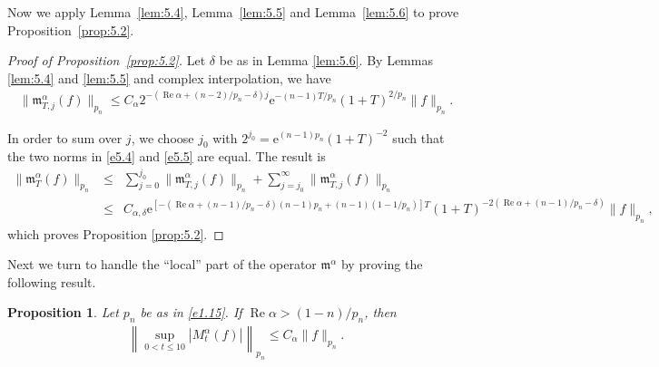 \documentclass[11pt]{amsproc}
\newcommand{\e}{\mathrm{e}}
\newcommand{\fm}{\mathfrak{m}}
\newcommand{\0}{\mathbf{0}}
\renewcommand{\Re}{\mathop{\mathrm{Re}}}
\numberwithin{equation}{section}
\numberwithin{figure}{section}
\newtheorem{prop}[thm]{Proposition}
\theoremstyle{definition}
\theoremstyle{remark}
\numberwithin{thm}{section}
\begin{document}
Now we apply Lemma~\ref{lem:5.4}, Lemma~\ref{lem:5.5} and Lemma~\ref{lem:5.6}  to prove    Proposition~\ref{prop:5.2}.





\begin{proof}[Proof of Proposition~\ref{prop:5.2}]
Let $\delta$ be as in Lemma \ref{lem:5.6}. By Lemmas \ref{lem:5.4} and \ref{lem:5.5} and complex interpolation, we have
\begin{eqnarray}
\|\fm^\alpha_{T,j}(f)\|_{p_n}\leq C_\alpha2^{-(\Re \alpha+(n-2)/p_n-\delta)j}\e^{-(n-1)T/p_n}(1+T)^{2/p_n}\|f\|_{p_n}\label{e5.5}.
\end{eqnarray}

In order to sum over $j$, we choose  $j_0$ with $2^{j_0}=\e^{(n-1)p_n}(1+T)^{-2}$   such that the two norms in \eqref{e5.4} and \eqref{e5.5} are  equal. The result is
\begin{eqnarray*}
\|\fm^\alpha_T(f)\|_{p_n}
&\leq&\sum_{j=0}^{j_0}\|\fm^\alpha_{T,j}(f)\|_{p_n} +\sum_{j= j_0}^{\infty} \|\fm^\alpha_{T,j}(f)\|_{p_n}\\
&\leq &C_{\alpha,\delta}\e^{[-(\Re\alpha+(n-1)/p_n-\delta)(n-1)p_n+(n-1)(1-1/p_n)]T}(1+T)^{-2(\Re\alpha+(n-1)/p_n-\delta)}\|f\|_{p_n},
\end{eqnarray*}
which proves   Proposition \ref{prop:5.2}.
\end{proof}




Next we turn to handle the ``local'' part of the operator $\fm^\alpha$ by proving the following result.


\begin{prop}\label{prop:5.7} Let $p_n$ be as in \eqref{e1.15}.
If $\Re\alpha>(1-n)/p_n$, then
\begin{eqnarray}\label{e5.122}
\left\|\sup_{0<t\leq 10}|M^\alpha_t(f)|\right\|_{p_n}\leq C_\alpha\|f\|_{p_n}.
\end{eqnarray}
\end{prop}
\end{document}
